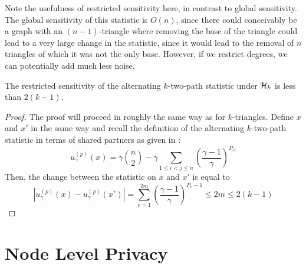 Note the usefulness of restricted sensitivity here, in contrast to global sensitivity. The global sensitivity of this statistic is $O(n)$, since there could conceivably be a graph with an $(n-1)$-triangle where removing the base of the triangle could lead to a very large change in the statistic, since it would lead to the removal of $n$ triangles of which it was not the only base. However, if we restrict degrees, we can potentially add much less noise.

\begin{claim}
The restricted sensitivity of the alternating $k$-two-path statistic under $\mathcal{H}_k$ is less than $2(k-1)$.
\end{claim}
\begin{proof}
The proof will proceed in roughly the same way as for $k$-triangles. Define $x$ and $x'$ in the same way and recall the definition of the alternating $k$-two-path statistic in terms of shared partners as given in :
$$
u_\gamma^{(p)}(x) = \gamma \binom{n}{2} - \gamma \sum_{1 \leq i < j \leq n} \left(\frac{\gamma-1}{\gamma} \right)^{P_{ij}}
$$
Then, the change between the statistic on $x$ and $x'$ is equal to 
$$|u_\gamma^{(p)}(x) -  u_\gamma^{(p)}(x')| = \sum_{e = 1}^{2m} \left( \frac{\gamma - 1}{\gamma} \right)^{P_e - 1} \leq 2m \leq 2(k-1)$$
\end{proof}

\section{Node Level Privacy}

